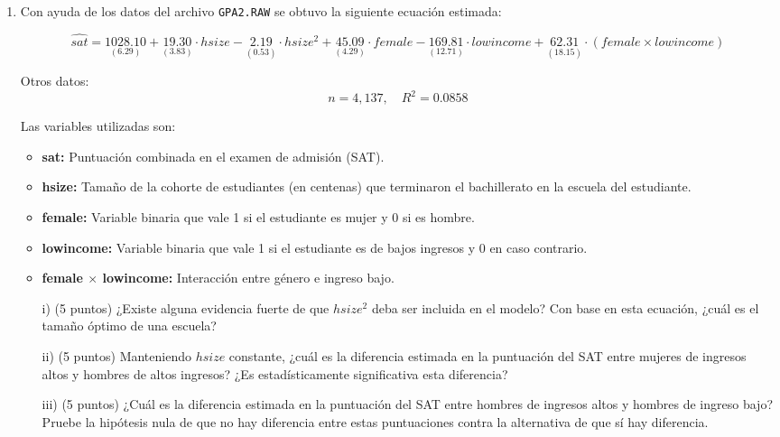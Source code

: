 \documentclass[10pt,a4paper]{article}
\begin{document}
\begin{enumerate}
 \item  Con ayuda de los datos del archivo \texttt{GPA2.RAW} se obtuvo la siguiente ecuación estimada:

\[
\widehat{sat} =
\underset{(6.29)}{1028.10} +
\underset{(3.83)}{19.30} \cdot hsize -
\underset{(0.53)}{2.19} \cdot hsize^2 +
\underset{(4.29)}{45.09} \cdot female -
\underset{(12.71)}{169.81} \cdot lowincome +
\underset{(18.15)}{62.31} \cdot (female \times lowincome)
\]


\vspace{1em}
\noindent
Otros datos:
\[
n = 4{,}137, \quad R^2 = 0.0858
\]

\vspace{1em}
\noindent
Las variables utilizadas son:

\begin{itemize}
    \item \textbf{sat:} Puntuación combinada en el examen de admisión (SAT).
    \item \textbf{hsize:} Tamaño de la cohorte de estudiantes (en centenas) que terminaron el bachillerato en la escuela del estudiante.
    \item \textbf{female:} Variable binaria que vale 1 si el estudiante es mujer y 0 si es hombre.
    \item \textbf{lowincome:} Variable binaria que vale 1 si el estudiante es de bajos ingresos y 0 en caso contrario.
    \item \textbf{female $\times$ lowincome:} Interacción entre género e ingreso bajo.
\end{itemize}

\vspace{1em}

\begin{enumerate}
    \item[i)] (5 puntos) ¿Existe alguna evidencia fuerte de que $hsize^2$ deba ser incluida en el modelo? Con base en esta ecuación, ¿cuál es el tamaño óptimo de una escuela?
    
    \item[ii)] (5 puntos) Manteniendo $hsize$ constante, ¿cuál es la diferencia estimada en la puntuación del SAT entre mujeres de ingresos altos y hombres de altos ingresos? ¿Es estadísticamente significativa  esta diferencia?
    
    \item[iii)] (5 puntos) ¿Cuál es la diferencia estimada en la puntuación del SAT entre hombres de ingresos altos y hombres de ingreso bajo? Pruebe la hipótesis nula de que no hay diferencia entre estas puntuaciones contra la alternativa de que sí hay diferencia.
    

\end{enumerate}
\end{enumerate}
\end{document}
